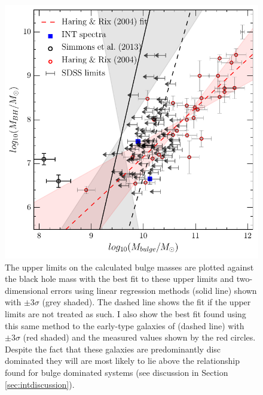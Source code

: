 {\begin{figure}
\centering
\includegraphics[width=\textwidth]{agn/mass_bh_bulge_limits_INT_simmons13_measurements_linmix_fit.pdf}
\caption[Black hole bulge mass relation for the \textsc{discdom} sample]{The upper limits on the calculated bulge masses are plotted against the black hole mass with the best fit to these upper limits and two-dimensional errors using linear regression methods (solid line) shown with $\pm3\sigma$ (grey shaded). The dashed line shows the fit if the upper limits are not treated as such. I also show the best fit found using this same method to the early-type galaxies of \citet{haringrix04} (dashed line) with $\pm3\sigma$ (red shaded) and the measured values shown by the red circles. Despite the fact that these galaxies are predominantly disc dominated they will are most likely to lie above the \citet{haringrix04} relationship found for bulge dominated systems (see discussion in Section \ref{sec:intdiscussion}).
}
\label{fig:bulgevsbh}
\end{figure}


}
